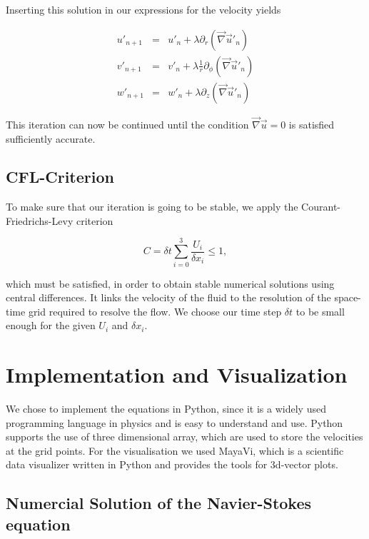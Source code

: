 \documentclass[12pt, a4paper]{article} %
\newcommand{\todoRef}{\todo[color=green!20]}
\begin{document}
		Inserting this solution in our expressions for the velocity yields
		
		\begin{eqnarray}
			u'_{n+1} &=& u'_n + \lambda \partial_r (\vec{\nabla}\vec{u}'_n) \\
			v'_{n+1} &=& v'_n + \lambda \frac{1}{r} \partial_\phi (\vec{\nabla}\vec{u}'_n) \\
			w'_{n+1} &=& w'_n + \lambda \partial_z (\vec{\nabla}\vec{u}'_n)
			\label{eq:Drucknachregelung uvw}
		\end{eqnarray}
		
		This iteration can now be continued until the condition $\vec{\nabla}\vec{u}=0$ is satisfied sufficiently accurate. 
	
	\subsection{CFL-Criterion} %
		To make sure that our iteration is going to be stable, we apply the Courant-Friedrichs-Levy criterion
		
		\begin{equation}
			C = \delta t \sum_{i=0}^3 \frac{U_i}{\delta x_i} \leq 1 ,
			\label{eq:CFL}
		\end{equation}
		 
		which must be satisfied, in order to obtain stable numerical solutions using central differences. It links the velocity of the fluid to the resolution of the space-time grid required to resolve the flow. \todoRef{Stocker} %
		We choose our time step $\delta t$ to be small enough for the given $U_i$ and $\delta x_i$.
		
		
	\newpage
\section{Implementation and Visualization}

	We chose to implement the equations in Python, since it is a widely used programming language in physics and is easy to understand and use. Python supports the use of three dimensional array, which are used to store the velocities at the grid points. For the visualisation we used MayaVi, which is a scientific data visualizer written in Python and provides the tools for 3d-vector plots.

	\subsection{Numercial Solution of the Navier-Stokes equation}
		
\end{document}

